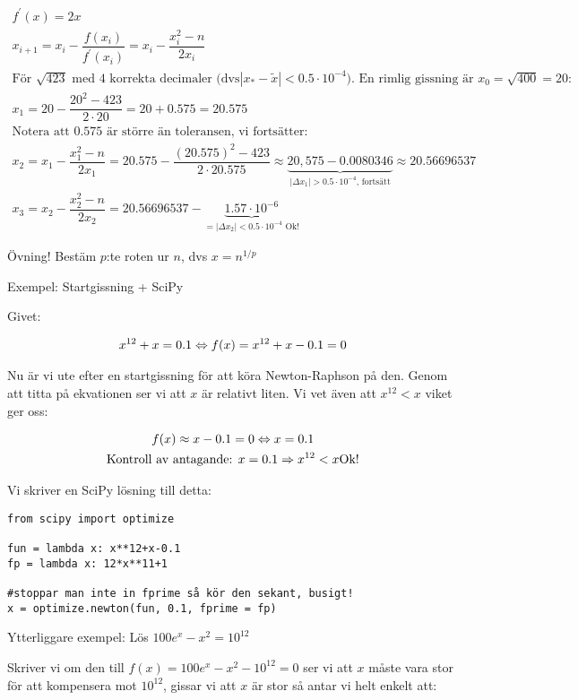 \begin{equation*}
  \begin{gathered}
    f^{\prime}(x) = 2x\\
    x_{i+1}=x_i-\dfrac{f(x_i)}{f^{\prime}(x_i)}=x_i-\dfrac{x_i^2-n}{2x_i}\\
    \text{För } \sqrt{423}\text{ med 4 korrekta decimaler (dvs} \left|x_*-\tilde{x}\right|<0.5\cdot10^{-4}\text{). En rimlig gissning är $x_0 = \sqrt{400} = 20$:}\\
    x_1 = 20-\dfrac{20^2-423}{2\cdot20}=20+0.575=20.575\\
    \text{Notera att 0.575 är större än toleransen, vi fortsätter:}\\
  x_2 = x_1-\dfrac{x_1^2-n}{2x_1} = 20.575-\dfrac{(20.575)^2-423}{2\cdot20.575}\approx \underbrace{20,575-0.0080346}_{\text{$\left|\Delta x_1\right| > 0.5\cdot10^{-4}$, fortsätt}}\approx 20.56696537\\
  x_3 = x_2 -\dfrac{x_2^2-n}{2x_2} = 20.56696537-\underbrace{1.57\cdot10^{-6}}_{\text{$=\left|\Delta x_2\right|<0.5\cdot10^{-4}$ Ok!}}
  \end{gathered}
\end{equation*}
\par\bigskip
\noindent Övning! Bestäm $p$:te roten ur $n$, dvs $x = n^{1/p}$
\par\bigskip
\noindent Exempel: Startgissning + SciPy\par
\noindent Givet:

\begin{equation*}
  \begin{gathered}
    x^{12}+x=0.1\Leftrightarrow f(x)=x^{12}+x-0.1=0
  \end{gathered}
\end{equation*}\par
\noindent Nu är vi ute efter en startgissning för att köra Newton-Raphson på den. Genom att titta på ekvationen ser vi att $x$ är relativt liten. Vi vet även att $x^{12}<x$ viket ger oss:

\begin{equation*}
  \begin{gathered}
    f(x)\approx x-0.1=0\Leftrightarrow x = 0.1\\
    \text{Kontroll av antagande: } x = 0.1\Rightarrow x^{12}<x\text{Ok!}
  \end{gathered}
\end{equation*}
\par
\noindent Vi skriver en SciPy lösning till detta:

\begin{verbatim}
from scipy import optimize

fun = lambda x: x**12+x-0.1
fp = lambda x: 12*x**11+1

#stoppar man inte in fprime så kör den sekant, busigt!
x = optimize.newton(fun, 0.1, fprime = fp) 
\end{verbatim}
\par\bigskip
\noindent Ytterliggare exempel: Lös $100e^x-x^2=10^{12}$\par
\noindent Skriver vi om den till $f(x) = 100e^x-x^2-10^{12}=0$ ser vi att $x$ måste vara stor för att kompensera mot $10^{12}$, gissar vi att $x$ är stor så antar vi helt enkelt att:

